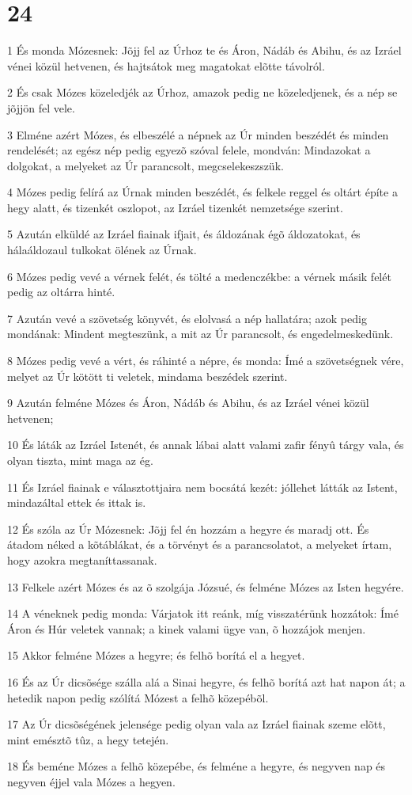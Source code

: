 \chapter{24}

\par 1 És monda Mózesnek: Jõjj fel az Úrhoz te és Áron, Nádáb és Abihu, és az Izráel vénei közül hetvenen, és hajtsátok meg magatokat elõtte távolról.
\par 2 És csak Mózes közeledjék az Úrhoz, amazok pedig ne közeledjenek, és a nép se jõjjön fel vele.
\par 3 Elméne azért Mózes, és elbeszélé a népnek az Úr minden beszédét és minden rendelését; az egész nép pedig egyezõ szóval felele, mondván: Mindazokat a dolgokat, a melyeket az Úr parancsolt, megcselekeszszük.
\par 4 Mózes pedig felírá az Úrnak minden beszédét, és felkele reggel és oltárt építe a hegy alatt, és tizenkét oszlopot, az Izráel tizenkét nemzetsége szerint.
\par 5 Azután elküldé az Izráel fiainak ifjait, és áldozának égõ áldozatokat, és hálaáldozaul tulkokat ölének az Úrnak.
\par 6 Mózes pedig vevé a vérnek felét, és tölté a medenczékbe: a vérnek másik felét pedig az oltárra hinté.
\par 7 Azután vevé a szövetség könyvét, és elolvasá a nép hallatára; azok pedig mondának: Mindent megteszünk, a mit az Úr parancsolt, és engedelmeskedünk.
\par 8 Mózes pedig vevé a vért, és ráhinté a népre, és monda: Ímé a szövetségnek vére, melyet az Úr kötött ti veletek, mindama beszédek szerint.
\par 9 Azután felméne Mózes és Áron, Nádáb és Abihu, és az Izráel vénei közül hetvenen;
\par 10 És láták az Izráel Istenét, és annak lábai alatt valami zafir fényû tárgy vala, és olyan tiszta, mint maga az ég.
\par 11 És Izráel fiainak e választottjaira nem bocsátá kezét: jóllehet látták az Istent, mindazáltal ettek és ittak is.
\par 12 És szóla az Úr Mózesnek: Jõjj fel én hozzám a hegyre és maradj ott. És átadom néked a kõtáblákat, és a törvényt és a parancsolatot, a melyeket írtam, hogy azokra megtaníttassanak.
\par 13 Felkele azért Mózes és az õ szolgája Józsué, és felméne Mózes az Isten hegyére.
\par 14 A véneknek pedig monda: Várjatok itt reánk, míg visszatérünk hozzátok: Ímé Áron és Húr veletek vannak; a kinek valami ügye van, õ hozzájok menjen.
\par 15 Akkor felméne Mózes a hegyre; és felhõ borítá el a hegyet.
\par 16 És az Úr dicsõsége szálla alá a Sinai hegyre, és felhõ borítá azt hat napon át; a hetedik napon pedig szólítá Mózest a felhõ közepébõl.
\par 17 Az Úr dicsõségének jelensége pedig olyan vala az Izráel fiainak szeme elõtt, mint emésztõ tûz, a hegy tetején.
\par 18 És beméne Mózes a felhõ közepébe, és felméne a hegyre, és negyven nap és negyven éjjel vala Mózes a hegyen.

